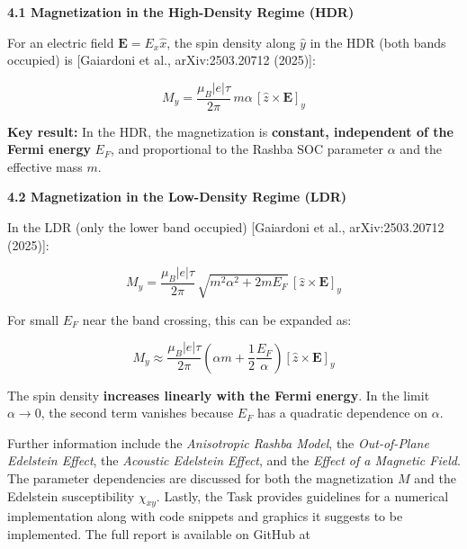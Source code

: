 \documentclass[
	fontsize = 11pt,
	paper = a4,
	draft = false,
	twoside = true,
	titlepage = false
]{scrartcl}
\numberwithin{equation}{subsection}
\begin{document}
	\begin{tcolorbox}[enhanced, breakable, title=Analytical Magnetization as Stated in the Output, colback=blue!5!white, colframe=blue!75!black] \label{pma:magn}
		\textbf{\Large4.1 Magnetization in the High-Density Regime (HDR)}
		
		For an electric field $\mathbf{E} = E_x\hat{x}$, the spin density along $\hat{y}$ in the HDR (both bands occupied) is [Gaiardoni et al., arXiv:2503.20712 (2025)]:
		
		$$
		\boxed{M_y = \frac{\mu_B |e|\tau}{2\pi}\,m\alpha\,[\hat{z}\times\mathbf{E}]_y}
		$$
		
		\textbf{Key result:} In the HDR, the magnetization is \textbf{constant, independent of the Fermi energy} $E_F$, and proportional to the Rashba SOC parameter $\alpha$ and the effective mass $m$.\newline
		
		\textbf{\Large4.2 Magnetization in the Low-Density Regime (LDR)}
		
		In the LDR (only the lower band occupied) [Gaiardoni et al., arXiv:2503.20712 (2025)]:
		
		$$
		\boxed{M_y = \frac{\mu_B |e|\tau}{2\pi}\,\sqrt{m^2\alpha^2 + 2mE_F}\,[\hat{z}\times\mathbf{E}]_y}
		$$
		
		For small $E_F$ near the band crossing, this can be expanded as:
		
		$$
		M_y \approx \frac{\mu_B |e|\tau}{2\pi}\left(\alpha m + \frac{1}{2}\frac{E_F}{\alpha}\right)[\hat{z}\times\mathbf{E}]_y
		$$
		
		The spin density \textbf{increases linearly with the Fermi energy}. In the limit $\alpha \to 0$, the second term vanishes because $E_F$ has a quadratic dependence on $\alpha$.
	\end{tcolorbox}
	Further information include the \textit{Anisotropic Rashba Model}, the \textit{Out-of-Plane Edelstein Effect}, the \textit{Acoustic Edelstein Effect}, and the \textit{Effect of a Magnetic Field}. The parameter dependencies are discussed for both the magnetization $M$ and the Edelstein susceptibility $\chi_{xy}$. Lastly, the Task provides guidelines for a numerical implementation along with code snippets and graphics it suggests to be implemented. The full report is available on GitHub at \autocite{gitInfo}
	
\end{document}
